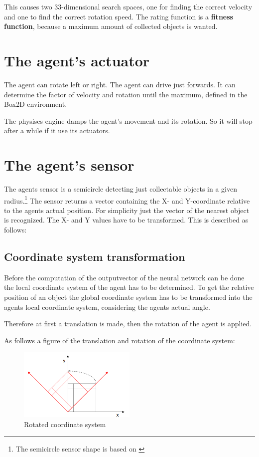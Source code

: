 \documentclass[10pt,a4paper,DIV=11]{scrreprt}
\begin{document}
This causes two 33-dimensional search spaces, one for finding the correct velocity and one to find the correct rotation speed. The rating function is a \textbf{fitness function}, because a maximum amount of collected objects is wanted.


\section{The agent's actuator}
The agent can rotate left or right.
The agent can drive just forwards.
It can determine the factor of velocity and rotation until the maximum, defined in the Box2D environment.

The physiscs engine damps the agent's movement and its rotation. So it will stop after a while if it use its actuators.

\section{The agent's sensor}
The agents sensor is a semicircle detecting just collectable objects in a given radius.\footnote{The semicircle sensor shape is based on \cite{iforce}} The sensor returns a vector containing the X- and Y-coordinate relative to the agents actual position. For simplicity just the vector of the nearest object is recognized.
The X- and Y values have to be transformed. This is described as follows:

\subsection*{Coordinate system transformation}
Before the computation of the outputvector of the neural network can be done the local coordinate system of the agent has to be determined.
To get the relative position of an object the global coordinate system has to be transformed into the agents local coordinate system, considering the agents actual angle.

Therefore at first a translation is made, then the rotation of the agent is applied.

As follows a figure of the translation and rotation of the coordinate system:

\begin{center}
	\begin{figure}[H]
		\centering
		\includegraphics[width=0.5\textwidth,scale=1.0]{files/CoordinateRotation.png}  
		\caption{Rotated coordinate system \cite{wikkoor}}
		\label{fig:cosys-transform}
	\end{figure}
\end{center}
\end{document}
